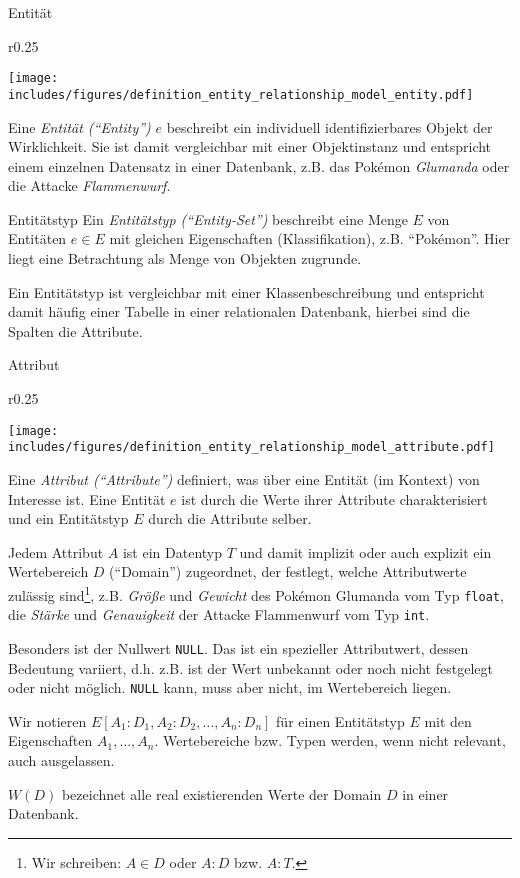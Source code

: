 \begin{defi}{Entität}
    \begin{wrapfigure}{r}{0.25\textwidth}
        \begin{center}
            \texttt{[image: includes/figures/definition\_entity\_relationship\_model\_entity.pdf]}
        \end{center}
    \end{wrapfigure}
    Eine \emph{Entität (\enquote{Entity})} $e$ beschreibt ein individuell identifizierbares Objekt der Wirklichkeit.
    Sie ist damit vergleichbar mit einer Objektinstanz und entspricht einem einzelnen Datensatz in einer Datenbank, z.B. das Pokémon \emph{Glumanda} oder die Attacke \emph{Flammenwurf}.
\end{defi}

\begin{defi}{Entitätstyp}
    Ein \emph{Entitätstyp (\enquote{Entity-Set})} beschreibt eine Menge $E$ von Entitäten $e \in E$ mit gleichen Eigenschaften (Klassifikation), z.B. \enquote{Pokémon}.
    Hier liegt eine Betrachtung als Menge von Objekten zugrunde.

    Ein Entitätstyp ist vergleichbar mit einer Klassenbeschreibung und entspricht damit häufig einer Tabelle in einer relationalen Datenbank, hierbei sind die Spalten die Attribute.
\end{defi}

\begin{defi}{Attribut}
    \begin{wrapfigure}{r}{0.25\textwidth}
        \begin{center}
            \texttt{[image: includes/figures/definition\_entity\_relationship\_model\_attribute.pdf]}
        \end{center}
    \end{wrapfigure}
    Eine \emph{Attribut (\enquote{Attribute})} definiert, was über eine Entität (im Kontext) von Interesse ist.
    Eine Entität $e$ ist durch die Werte ihrer Attribute charakterisiert und ein Entitätstyp $E$ durch die Attribute selber.

    Jedem Attribut $A$ ist ein Datentyp $T$ und damit implizit oder auch explizit ein Wertebereich $D$ (\enquote{Domain}) zugeordnet, der festlegt, welche Attributwerte zulässig sind\footnote{Wir schreiben: $A \in D$ oder $A:D$ bzw. $A:T$.}, z.B. \emph{Größe} und \emph{Gewicht} des Pokémon Glumanda vom Typ \texttt{float}, die \emph{Stärke} und \emph{Genauigkeit} der Attacke Flammenwurf vom Typ \texttt{int}.

    Besonders ist der Nullwert \texttt{NULL}.
    Das ist ein spezieller Attributwert, dessen Bedeutung variiert, d.h. z.B. ist der Wert unbekannt oder noch nicht festgelegt oder nicht möglich.
    \texttt{NULL} kann, muss aber nicht, im Wertebereich liegen.

    Wir notieren $E[A_1 : D_1, A_2 : D_2, \ldots, A_n : D_n]$ für einen Entitätstyp $E$ mit den Eigenschaften $A_1, \ldots, A_n$.
    Wertebereiche bzw. Typen werden, wenn nicht relevant, auch ausgelassen.

    $W(D)$ bezeichnet alle real existierenden Werte der Domain $D$ in einer Datenbank.
\end{defi}

